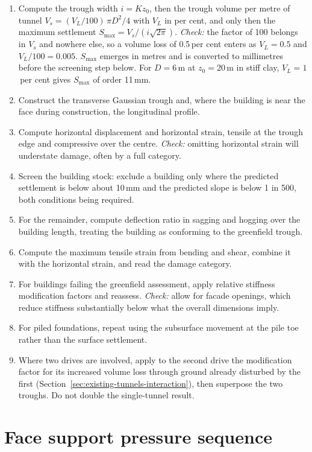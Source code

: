 \begin{enumerate}
  \item Compute the trough width $i = K z_0$, then the trough volume per
  metre of tunnel $V_s = (V_L/100)\,\pi D^2/4$ with $V_L$ in per cent, and
  only then the maximum settlement $S_{\max} = V_s / (i \sqrt{2\pi})$.
  \emph{Check:} the factor of 100 belongs in $V_s$ and nowhere else, so a
  volume loss of 0.5\,per cent enters as $V_L = 0.5$ and $V_L/100 = 0.005$.
  $S_{\max}$ emerges in metres and is converted to millimetres before the
  screening step below. For $D = 6$\,m at $z_0 = 20$\,m in stiff clay,
  $V_L = 1$\,per cent gives $S_{\max}$ of order 11\,mm.
  \item Construct the transverse Gaussian trough and, where the building is
  near the face during construction, the longitudinal profile.
  \item Compute horizontal displacement and horizontal strain, tensile at the
  trough edge and compressive over the centre.
  \emph{Check:} omitting horizontal strain will understate damage, often by a
  full category.
  \item Screen the building stock: exclude a building only where the
  predicted settlement is below about 10\,mm and the predicted slope is below
  1 in 500, both conditions being required.
  \item For the remainder, compute deflection ratio in sagging and hogging
  over the building length, treating the building as conforming to the
  greenfield trough.
  \item Compute the maximum tensile strain from bending and shear, combine it
  with the horizontal strain, and read the damage category.
  \item For buildings failing the greenfield assessment, apply relative
  stiffness modification factors and reassess.
  \emph{Check:} allow for facade openings, which reduce stiffness
  substantially below what the overall dimensions imply.
  \item For piled foundations, repeat using the subsurface movement at the
  pile toe rather than the surface settlement.
  \item Where two drives are involved, apply to the second drive the
  modification factor for its increased volume loss through ground already
  disturbed by the first (Section~\ref{sec:existing-tunnels-interaction}), then
  superpose the two troughs. Do not double the single-tunnel result.
\end{enumerate}

\section{Face support pressure sequence}
\label{sec:seq-face-pressure}

